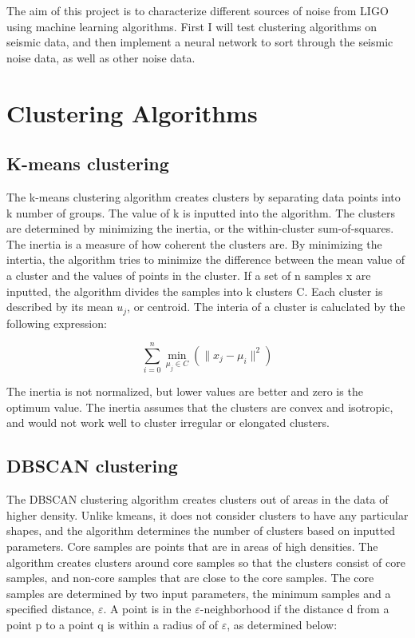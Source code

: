 \documentclass[colorlinks=true,pdfstartview=FitV,linkcolor=blue,
            citecolor=red,urlcolor=magenta]{ligodoc}
\begin{document}
\par The aim of this project is to characterize different sources of noise from LIGO using machine learning algorithms. First I  will test clustering algorithms on seismic data, and then implement a neural network to sort through the seismic noise data, as well as other noise data.

\section{Clustering Algorithms}

\subsection{K-means clustering}

\indent

\par The k-means clustering algorithm creates clusters by separating data points into k number of groups. The value of k is inputted into the algorithm. The clusters are determined by minimizing the inertia, or the within-cluster sum-of-squares. The inertia is a measure of how coherent the clusters are. By minimizing the intertia, the algorithm tries to minimize the difference between the mean value of a cluster and the values of points in the cluster. If a set of n samples x are inputted, the algorithm divides the samples into k clusters C. Each cluster is described by its mean \(u_j\), or centroid. The interia of a cluster is caluclated by the following expression:

\[\sum_{i=0}^{n} \min_{\mu_j \in  C}(\|x_j-\mu_i\|^2)\]

\par The inertia is not normalized, but lower values are better and zero is the optimum value. The inertia assumes that the clusters are convex and isotropic, and would not work well to cluster irregular or elongated clusters. \cite{Citation2} 

\subsection{DBSCAN clustering}

\indent

\par The DBSCAN clustering algorithm creates clusters out of areas in the data of higher density. Unlike kmeans, it does not consider clusters to have any particular shapes, and the algorithm determines the number of clusters based on inputted parameters. Core samples are points that are in areas of high densities. The algorithm creates clusters around core samples so that the clusters consist of core samples, and non-core samples that are close to the core samples. The core samples are determined by two input parameters, the minimum samples and a specified distance, $\varepsilon$. A point is in the $\varepsilon$-neighborhood if the distance d from a point p to a point q is within a radius of of $\varepsilon$, as determined below: 
\end{document}
